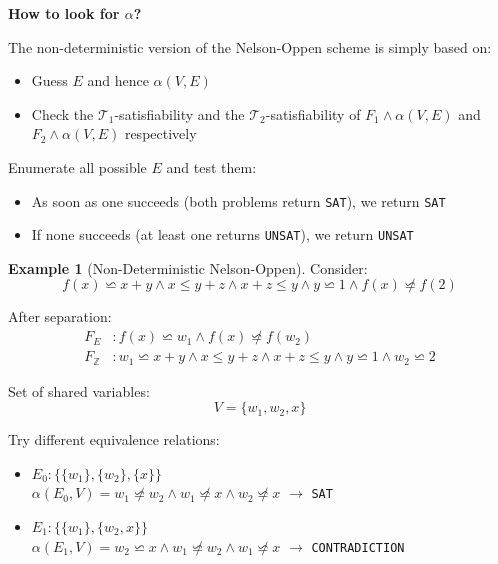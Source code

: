 \documentclass[11pt,a4paper]{article}
\theoremstyle{definition}
\newtheorem{example}{Example}[section]
\theoremstyle{plain}
\theoremstyle{remark}
\begin{document}
\textbf{How to look for $\alpha$?}

The non-deterministic version of the Nelson-Oppen scheme is simply based on:
\begin{itemize}
    \item Guess $E$ and hence $\alpha(V, E)$
    \item Check the $\mathcal{T}_1$-satisfiability and the $\mathcal{T}_2$-satisfiability of $F_1 \wedge \alpha(V, E)$ and $F_2 \wedge \alpha(V, E)$ respectively
\end{itemize}

Enumerate all possible $E$ and test them:
\begin{itemize}
    \item As soon as one succeeds (both problems return \texttt{SAT}), we return \texttt{SAT}
    \item If none succeeds (at least one returns \texttt{UNSAT}), we return \texttt{UNSAT}
\end{itemize}

\begin{example}[Non-Deterministic Nelson-Oppen]
Consider:
\[
f(x) \backsimeq x + y \wedge x \leq y + z \wedge x + z \leq y \wedge y \backsimeq 1 \wedge f(x) \not\backsimeq f(2)
\]

After separation:
\begin{align*}
F_E &: f(x) \backsimeq w_1 \wedge f(x) \not\backsimeq f(w_2) \\
F_{\mathbb{Z}} &: w_1 \backsimeq x + y \wedge x \leq y + z \wedge x + z \leq y \wedge y \backsimeq 1 \wedge w_2 \backsimeq 2
\end{align*}

Set of shared variables:
\[
V = \{w_1, w_2, x\}
\]

Try different equivalence relations:
\begin{itemize}
    \item $E_0: \{\{w_1\}, \{w_2\}, \{x\}\}$ \\
    $\alpha(E_0, V) = w_1 \not\backsimeq w_2 \wedge w_1 \not\backsimeq x \wedge w_2 \not\backsimeq x$ $\longrightarrow$ \texttt{SAT}

    \item $E_1: \{\{w_1\}, \{w_2, x\}\}$ \\
    $\alpha(E_1, V) = w_2 \backsimeq x \wedge w_1 \not\backsimeq w_2 \wedge w_1 \not\backsimeq x$ $\longrightarrow$ \texttt{CONTRADICTION}
\end{itemize}
\end{example}
\end{document}
